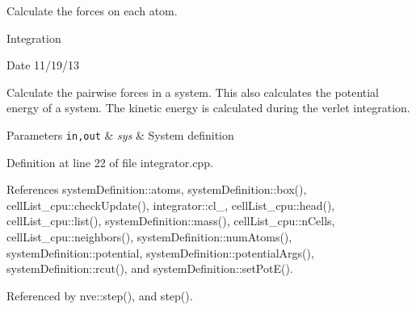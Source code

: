 Calculate the forces on each atom. 

Integration \begin{DoxyDate}{Date}
11/19/13
\end{DoxyDate}
Calculate the pairwise forces in a system. This also calculates the potential energy of a system. The kinetic energy is calculated during the verlet integration.


\begin{DoxyParams}[1]{Parameters}
\mbox{\tt in,out}  & {\em sys} & System definition \\
\hline
\end{DoxyParams}


Definition at line 22 of file integrator.\-cpp.



References system\-Definition\-::atoms, system\-Definition\-::box(), cell\-List\-\_\-cpu\-::check\-Update(), integrator\-::cl\-\_\-, cell\-List\-\_\-cpu\-::head(), cell\-List\-\_\-cpu\-::list(), system\-Definition\-::mass(), cell\-List\-\_\-cpu\-::n\-Cells, cell\-List\-\_\-cpu\-::neighbors(), system\-Definition\-::num\-Atoms(), system\-Definition\-::potential, system\-Definition\-::potential\-Args(), system\-Definition\-::rcut(), and system\-Definition\-::set\-Pot\-E().



Referenced by nve\-::step(), and step().


